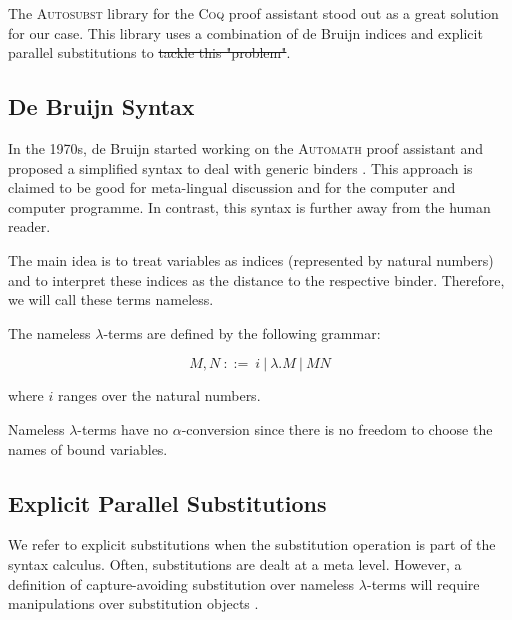The \textsc{Autosubst} library for the \textsc{Coq} proof assistant stood out as a great solution for our case. 
This library uses a combination of de Bruijn indices and explicit parallel substitutions to \sout{tackle this "problem"}.


\subsection{De Bruijn Syntax}

\cite{deBruijn} \cite{AutosubstSchafer}

In the 1970s, de Bruijn started working on the \textsc{Automath} proof assistant and proposed a simplified syntax to deal with generic binders \cite{deBruijn}.
This approach is claimed to be good for meta-lingual discussion and for the computer and computer programme. In contrast, this syntax is further away from the human reader.

The main idea is to treat variables as indices (represented by natural numbers) and to interpret these indices as the distance to the respective binder.
Therefore, we will call these terms nameless. 

\begin{definition}
  The nameless $\lambda$-terms are defined by the following grammar:

  \[ M, N \ ::= \ i \ | \ \lambda . M \ | \ M N \]

  where $i$ ranges over the natural numbers.
\end{definition}

\begin{remark}
  Nameless $\lambda$-terms have no $\alpha$-conversion since there is no freedom to choose the names of bound variables.
\end{remark}

\subsection{Explicit Parallel Substitutions}

\cite{AutosubstSchafer}

We refer to explicit substitutions \cite{Abadi} when the substitution operation is part of the syntax calculus.
Often, substitutions are dealt at a meta level.
However, a definition of capture-avoiding substitution over nameless $\lambda$-terms will require manipulations over substitution objects \cite{deBruijn}.

